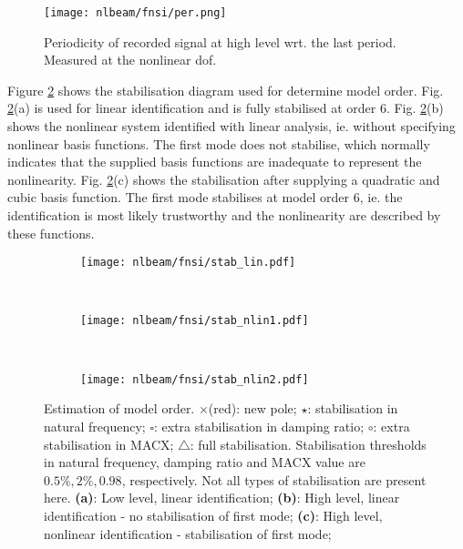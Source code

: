 \begin{figure}[!ht]
  \centering
  \texttt{[image: nlbeam/fnsi/per.png]}
  \caption{Periodicity of recorded signal at high level wrt. the last period.
    Measured at the nonlinear dof.}
  \label{fig:nlbeam_per}
\end{figure}

Figure \ref{fig:nlbeam_stab} shows the stabilisation diagram used for determine
model order. Fig. \ref{fig:nlbeam_stab}(a) is used for linear identification and
is fully stabilised at order 6. Fig. \ref{fig:nlbeam_stab}(b) shows the
nonlinear system identified with linear analysis, ie. without specifying
nonlinear basis functions. The first mode does not stabilise, which normally
indicates that the supplied basis functions are inadequate to represent the
nonlinearity. Fig. \ref{fig:nlbeam_stab}(c) shows the stabilisation after
supplying a quadratic and cubic basis function. The first mode stabilises at
model order 6, ie. the identification is most likely trustworthy and the
nonlinearity are described by these functions.

\begin{figure}
  \centering
    \begin{subfigure}[b]{0.45\textwidth}
      \texttt{[image: nlbeam/fnsi/stab\_lin.pdf]}
    \end{subfigure}
    ~
    \begin{subfigure}[b]{0.45\textwidth}
      \texttt{[image: nlbeam/fnsi/stab\_nlin1.pdf]}
    \end{subfigure}
    \\
    \begin{subfigure}[b]{0.45\textwidth}
      \texttt{[image: nlbeam/fnsi/stab\_nlin2.pdf]}
    \end{subfigure}
    \caption{Estimation of model order.
    $\pmb\times$(red): new pole;
    $\pmb\star$: stabilisation in natural frequency;
    $\pmb\square$: extra stabilisation in damping ratio;
    $\pmb\circ$: extra stabilisation in MACX;
    $\pmb\triangle$: full stabilisation.
    Stabilisation thresholds in natural frequency, damping ratio and MACX value
    are $0.5\%, 2\%, 0.98$, respectively. Not all types of stabilisation are
    present here.
    \textbf{(a)}: Low level, linear identification;
    \textbf{(b)}: High level, linear identification - no stabilisation of first mode;
    \textbf{(c)}: High level, nonlinear identification - stabilisation of first mode;
  }
  \label{fig:nlbeam_stab}
\end{figure}


